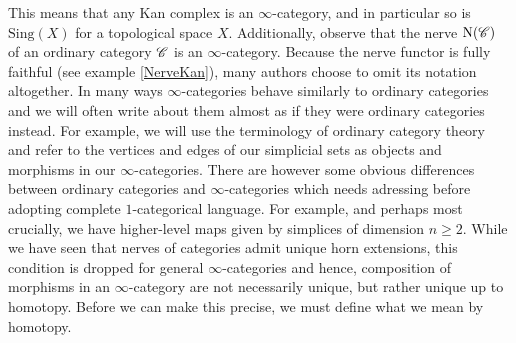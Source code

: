 \documentclass[../../thesis.tex]{subfiles}
\begin{document}
This means that any Kan complex is an $\infty$-category, and in particular so is $\mathrm{Sing}(X)$ for a topological space $X$.
Additionally, observe that the nerve $\mathrm{N}(\mathscr{C})$ of an ordinary category $\mathscr{C}$ is an $\infty$-category.
Because the nerve functor is fully faithful (see example \ref{NerveKan}), many authors choose to omit its notation altogether.
In many ways $\infty$-categories behave similarly to ordinary categories and we will often write about them almost as if they were ordinary categories instead.
For example, we will use the terminology of ordinary category theory and refer to the vertices and edges of our simplicial sets as objects and morphisms in our $\infty$-categories.
There are however some obvious differences between ordinary categories and $\infty$-categories which needs adressing before adopting complete $1$-categorical language.
For example, and perhaps most crucially, we have higher-level maps given by simplices of dimension $n\geq 2$.
While we have seen that nerves of categories admit unique horn extensions, this condition is dropped for general $\infty$-categories and hence, composition of morphisms in an $\infty$-category are not necessarily unique, but rather unique up to homotopy.
Before we can make this precise, we must define what we mean by homotopy.
\end{document}
